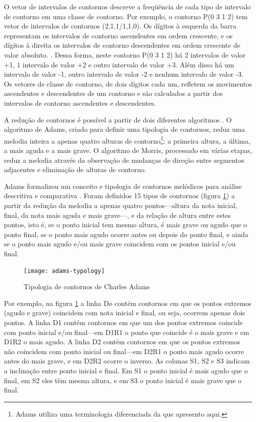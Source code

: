 O vetor de intervalos de contornos descreve a freqüência de cada tipo
de intervalo de contorno em uma classe de contorno. Por exemplo, o
contorno P(0 3 1 2) tem vetor de intervalos de contornos
(2,1,1/1,1,0). Os dígitos à esquerda da barra representam os
intervalos de contorno ascendentes em ordem crescente, e os dígitos à
direita os intervalos de contorno descendentes em ordem crescente de
valor absoluto. \cite{friedmann85:methodology}. Dessa forma, neste
contorno P(0 3 1 2) há 2 intervalos de valor +1, 1 intervalo de valor
+2 e outro intervalo de valor +3. Além disso há um intervalo de valor
-1, outro intervalo de valor -2 e nenhum intervalo de valor -3. Os
vetores de classe de contorno, de dois dígitos cada um, refletem os
movimentos ascendentes e descendentes de um contorno e são calculados
a partir dos intervalos de contorno ascendentes e descendentes.

A redução de contornos é possível a partir de dois diferentes
algoritmos \cite{adams76:melodic,morris93:directions}. O algoritmo de
Adams, criado para definir uma tipologia de contornos, reduz uma
melodia inteira a apenas quatro alturas de contorno\footnote{Adams
  utiliza uma terminologia diferenciada da que apresento aqui.}: a
primeira altura, a última, a mais aguda e a mais grave. O algoritmo de
Morris, processado em várias etapas, reduz a melodia através da
observação de mudanças de direção entre segmentos adjacentes e
eliminação de alturas de contorno.

Adams formalizou um conceito e tipologia de contornos melódicos para
análise descritiva e comparativa \cite{adams76:melodic}. Foram
definidos 15 tipos de contornos (figura \ref{fig:adams-typology}) a
partir da redução da melodia a apenas quatro pontos---altura da nota
inicial, final, da nota mais aguda e mais grave---, e da relação de
altura entre estes pontos, isto é, se o ponto inicial tem mesmo
altura, é mais grave ou agudo que o ponto final, se o ponto mais agudo
ocorre antes ou depois do ponto final, e ainda se o ponto mais agudo
e/ou mais grave coincidem com os pontos inicial e/ou final.

\begin{figure}
  \centering
  \texttt{[image: adams-typology]}
  \caption{Tipologia de contornos de Charles Adams}
  \label{fig:adams-typology}
\end{figure}

Por exemplo, na figura \ref{fig:adams-typology} a linha Dø contém
contornos em que os pontos extremos (agudo e grave) coincidem com nota
inicial e final, ou seja, ocorrem apenas dois pontos. A linha D1
contém contornos em que um dos pontos extremos coincide com ponto
inicial e/ou final---em D1R1 o ponto que coincide é o mais grave e em
D1R2 o mais agudo. A linha D2 contém contornos em que os pontos
extremos não coincidem com ponto inicial ou final---em D2R1 o ponto
mais agudo ocorre antes do mais grave, e em D2R2 ocorre o inverso. As
colunas S1, S2 e S3 indicam a inclinação entre ponto inicial e
final. Em S1 o ponto inicial é mais agudo que o final, em S2 eles têm
mesma altura, e em S3 o ponto inicial é mais grave que o final.

